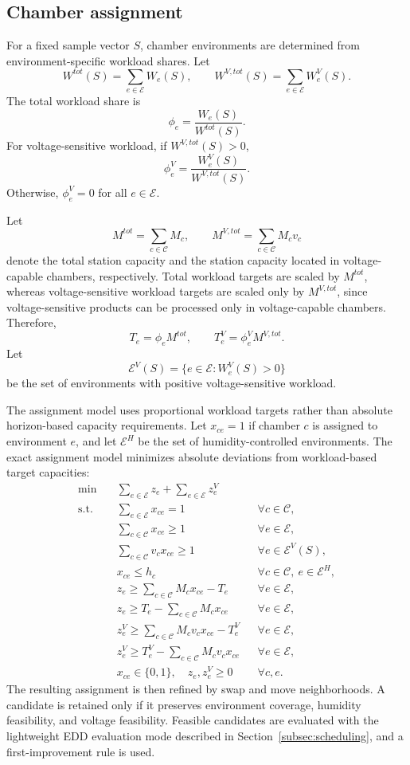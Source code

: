 \documentclass[11pt]{article}
\begin{document}
\subsection{Chamber assignment}
\label{subsec:chamber_assignment}

For a fixed sample vector \(S\), chamber environments are determined from environment-specific workload shares. Let
\[
W^{tot}(S)=\sum_{e\in\mathcal{E}}W_e(S),
\qquad
W^{V,tot}(S)=\sum_{e\in\mathcal{E}}W_e^V(S).
\]
The total workload share is
\[
\phi_e=\frac{W_e(S)}{W^{tot}(S)}.
\]
For voltage-sensitive workload, if \(W^{V,tot}(S)>0\),
\[
\phi_e^V=\frac{W_e^V(S)}{W^{V,tot}(S)}.
\]
Otherwise, \(\phi_e^V=0\) for all \(e\in\mathcal{E}\).

Let
\[
M^{tot}=\sum_{c\in\mathcal{C}}M_c,
\qquad
M^{V,tot}=\sum_{c\in\mathcal{C}}M_cv_c
\]
denote the total station capacity and the station capacity located in voltage-capable chambers, respectively. Total workload targets are scaled by \(M^{tot}\), whereas voltage-sensitive workload targets are scaled only by \(M^{V,tot}\), since voltage-sensitive products can be processed only in voltage-capable chambers. Therefore,
\[
T_e=\phi_e M^{tot},
\qquad
T_e^V=\phi_e^V M^{V,tot}.
\]
Let
\[
\mathcal{E}^V(S)=\{e\in\mathcal{E}: W_e^V(S)>0\}
\]
be the set of environments with positive voltage-sensitive workload.

The assignment model uses proportional workload targets rather than absolute horizon-based capacity requirements. Let \(x_{ce}=1\) if chamber \(c\) is assigned to environment \(e\), and let \(\mathcal{E}^H\) be the set of humidity-controlled environments. The exact assignment model minimizes absolute deviations from workload-based target capacities:
\begin{align}
\min\quad & \sum_{e\in\mathcal{E}}z_e+\sum_{e\in\mathcal{E}}z_e^V \\
\text{s.t.}\quad
& \sum_{e\in\mathcal{E}}x_{ce}=1 && \forall c\in\mathcal{C},\\
& \sum_{c\in\mathcal{C}}x_{ce}\ge 1 && \forall e\in\mathcal{E},\\
& \sum_{c\in\mathcal{C}}v_cx_{ce}\ge 1 && \forall e\in\mathcal{E}^V(S),\\
& x_{ce}\le h_c && \forall c\in\mathcal{C},\ e\in\mathcal{E}^H,\\
& z_e\ge \sum_{c\in\mathcal{C}}M_cx_{ce}-T_e && \forall e\in\mathcal{E},\\
& z_e\ge T_e-\sum_{c\in\mathcal{C}}M_cx_{ce} && \forall e\in\mathcal{E},\\
& z_e^V\ge \sum_{c\in\mathcal{C}}M_cv_cx_{ce}-T_e^V && \forall e\in\mathcal{E},\\
& z_e^V\ge T_e^V-\sum_{c\in\mathcal{C}}M_cv_cx_{ce} && \forall e\in\mathcal{E},\\
& x_{ce}\in\{0,1\},\quad z_e,z_e^V\ge 0 && \forall c,e.
\end{align}
The resulting assignment is then refined by swap and move neighborhoods. A candidate is retained only if it preserves environment coverage, humidity feasibility, and voltage feasibility. Feasible candidates are evaluated with the lightweight EDD evaluation mode described in Section~\ref{subsec:scheduling}, and a first-improvement rule is used.
\end{document}
